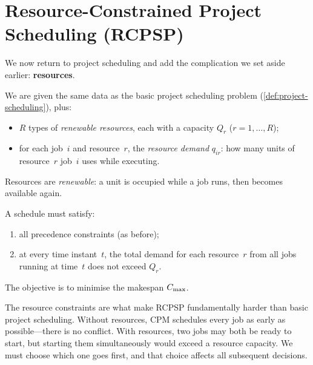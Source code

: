 \section{Resource-Constrained Project Scheduling (RCPSP)}
\label{sec:rcpsp}

We now return to project scheduling and add the complication we
set aside earlier: \textbf{resources}.

\begin{definition}
\label{def:rcpsp}
We are given the same data as the basic project scheduling
problem (\cref{def:project-scheduling}), plus:
\begin{itemize}[nosep]
  \item $R$ types of \emph{renewable resources}, each with a
        capacity $Q_r$ ($r = 1, \dots, R$);
  \item for each job~$i$ and resource~$r$, the
        \emph{resource demand} $q_{ir}$: how many units of
        resource~$r$ job~$i$ uses while executing.
\end{itemize}
Resources are \emph{renewable}: a unit is occupied while a job
runs, then becomes available again.%

\medskip\noindent
A schedule must satisfy:
\begin{enumerate}[nosep]
  \item all precedence constraints (as before);
  \item at every time instant~$t$, the total demand for each
        resource~$r$ from all jobs running at time~$t$ does not
        exceed $Q_r$.
\end{enumerate}
The objective is to minimise the makespan $C_{\max}$.
\end{definition}

The resource constraints are what make RCPSP fundamentally harder
than basic project scheduling.  Without resources, CPM schedules
every job as early as possible---there is no conflict.  With
resources, two jobs may both be ready to start, but starting
them simultaneously would exceed a resource capacity.  We must
choose which one goes first, and that choice affects all
subsequent decisions.

